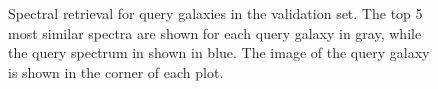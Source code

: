 \documentclass[a4paper,12pt]{article}
\begin{document}
\begin{figure}[H]

    \caption{Spectral retrieval for query galaxies in the validation set. The top 5 most similar spectra are shown for each query galaxy in gray, while the query spectrum in shown in blue. The image of the query galaxy is shown in the corner of each plot.
    }
    \label{fig:spectral_retrieval}
\end{figure}




\end{document}
